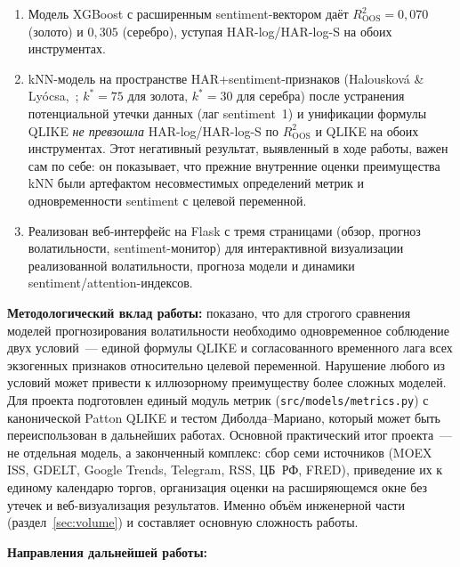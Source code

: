 \begin{enumerate}
    \item Модель XGBoost с расширенным sentiment-вектором даёт
          $R^2_{\mathrm{OOS}} = 0{,}070$ (золото) и $0{,}305$ (серебро),
          уступая HAR-log/HAR-log-S на обоих инструментах.

    \item kNN-модель на пространстве HAR+sentiment-признаков
          (Halousková \& Lyócsa,~\cite{Halouskova2025};
          $k^*=75$ для золота, $k^*=30$ для серебра)
          после устранения потенциальной утечки данных (лаг sentiment~1)
          и унификации формулы QLIKE \textit{не превзошла} HAR-log/HAR-log-S
          по $R^2_{\mathrm{OOS}}$ и QLIKE на обоих инструментах.
          Этот негативный результат, выявленный в ходе работы, важен сам по себе:
          он показывает, что прежние внутренние оценки преимущества kNN
          были артефактом несовместимых определений метрик и одновременности
          sentiment с целевой переменной.

    \item Реализован веб-интерфейс на Flask с тремя страницами (обзор,
          прогноз волатильности, sentiment-монитор) для интерактивной
          визуализации реализованной волатильности, прогноза модели
          и динамики sentiment/attention-индексов.
\end{enumerate}

\textbf{Методологический вклад работы:}
показано, что для строгого сравнения моделей прогнозирования
волатильности необходимо одновременное соблюдение двух условий~---
единой формулы QLIKE и согласованного временного лага всех экзогенных
признаков относительно целевой переменной. Нарушение любого из условий
может привести к иллюзорному преимуществу более сложных моделей.
Для проекта подготовлен единый модуль метрик (\texttt{src/models/metrics.py})
с канонической Patton QLIKE и тестом Диболда--Мариано,
который может быть переиспользован в дальнейших работах.
Основной практический итог проекта~--- не отдельная модель, а законченный
комплекс: сбор семи источников (MOEX ISS, GDELT, Google Trends, Telegram,
RSS, ЦБ~РФ, FRED), приведение их к единому календарю торгов, организация
оценки на расширяющемся окне без утечек и веб-визуализация результатов.
Именно объём инженерной части (раздел~\ref{sec:volume}) и составляет основную
сложность работы.

\textbf{Направления дальнейшей работы:}

